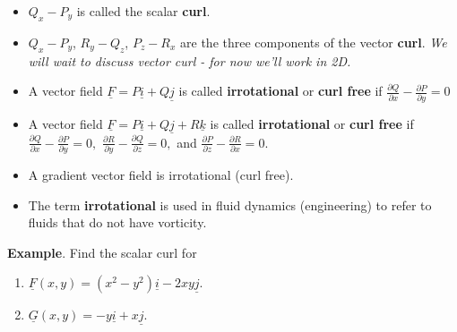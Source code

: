 \documentclass[12pt,letterpaper,noanswers]{exam}
\newcommand{\mb}[1]{\underline{#1}}
\begin{document}
\begin{tcolorbox}
\begin{itemize}
\itemsep0em
    \item $Q_x-P_y$ is called the scalar \textbf{curl}.
    \item $Q_x-P_y$, $R_y - Q_z$, $P_z - R_x$ are the three components of the vector \textbf{curl}.  \emph{We will wait to discuss vector curl - for now we'll work in 2D.}
    \item A vector field $\mb F = P\mb i +Q\mb j$ is called \textbf{irrotational} or \textbf{curl free} if $\displaystyle\frac{\partial Q}{\partial x}-\frac{\partial P}{\partial y}=0$
    \item A vector field $\mb F = P\mb i +Q\mb j +R\mb k$ is called \textbf{irrotational} or \textbf{curl free} if $\displaystyle\frac{\partial Q}{\partial x}-\frac{\partial P}{\partial y}=0,$ $\displaystyle\frac{\partial R}{\partial y} - \frac{\partial Q}{\partial z}=0,$ and $\displaystyle\frac{\partial P}{\partial z} - \frac{\partial R}{\partial x}=0.$
    \item A gradient vector field is irrotational (curl free).
    \item The term \textbf{irrotational} is used in fluid dynamics (engineering) to refer to fluids that do not have vorticity.
\end{itemize}
\end{tcolorbox}


\noindent\textbf{Example}.  Find the scalar curl for 
\begin{enumerate}
\itemsep3em
    \item $\mb F(x,y) = (x^2-y^2)\mb i - 2xy\mb j$.
    \item $\mb G(x,y) = -y\mb i + x \mb j$.
    \vspace{0.5in}
\end{enumerate}
\end{document}
